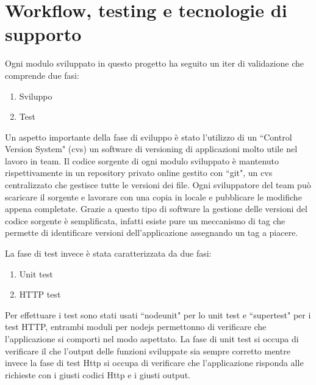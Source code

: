 \chapter{Workflow, testing e tecnologie di supporto}
Ogni modulo sviluppato in questo progetto ha seguito un iter di validazione che comprende due fasi:
\begin{enumerate}
	\item Sviluppo
	\item Test
\end{enumerate}

Un aspetto importante della fase di sviluppo è stato l'utilizzo di un ``Control Version System" (cvs) un software di versioning di applicazioni molto utile nel lavoro in team. Il codice sorgente di ogni modulo sviluppato è mantenuto rispettivamente in un repository privato online gestito con ``git", un cvs centralizzato che gestisce tutte le versioni dei file. Ogni sviluppatore del team può scaricare il sorgente e lavorare con una copia in locale e pubblicare le modifiche appena completate. Grazie a questo tipo di software la gestione delle versioni del codice sorgente è semplificata, infatti esiste pure un meccanismo di tag che permette di identificare versioni dell'applicazione assegnando un tag a piacere.

La fase di test invece è stata caratterizzata da due fasi:
\begin{enumerate}
	\item Unit test
	\item HTTP test
\end{enumerate}
Per effettuare i test sono stati usati ``nodeunit" per lo unit test e ``supertest" per i test HTTP, entrambi moduli per nodejs permettonno di verificare che l'applicazione si comporti nel modo aspettato. La fase di unit test si occupa di verificare il che l'output delle funzioni sviluppate sia sempre corretto mentre invece la fase di test Http si occupa di verificare che l'applicazione risponda alle richieste con i giusti codici Http e i giusti output.
